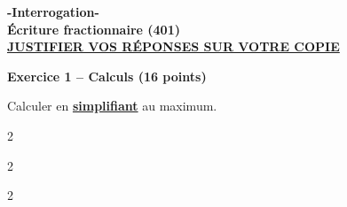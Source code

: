 \documentclass[12pt,a4paper]{exam}
\begin{document}
\begin{center}
\Large \textbf{-Interrogation-\\Écriture fractionnaire (401)}
\vspace{0.5cm}
\\\large \underline{\textbf{JUSTIFIER VOS RÉPONSES SUR VOTRE COPIE}}
\end{center}
\noindent\hrulefill
\vspace{0.5cm}


\textbf{Exercice 1 – Calculs (16 points)}
\vspace{5pt}

\begin{questions}
    \question[8] Calculer en \textbf{\underline{simplifiant}} au maximum.
    \vspace{5pt}
    \begin{multicols}{2}
    \end{multicols}
    \vspace{10pt}
    \begin{multicols}{2}
    \end{multicols}
    \vspace{10pt}
    \begin{multicols}{2}
        \begin{parts}
            \setcounter{partno}{4}

\end{parts}
\end{multicols}
\end{questions}
\end{document}

